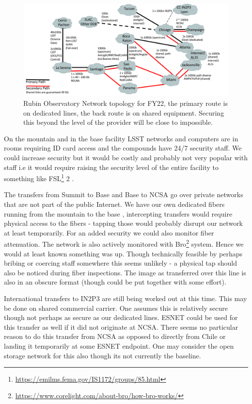 \begin{figure}
\begin{center}
\includegraphics[width=1.0\textwidth]{NetworksFY22}
\caption{Rubin Observatory Network topology for FY22, the primary route is on dedicated lines, the back route is on shared equipment. Securing this beyond the level of the provider will be close to impossible.  \label{fig:net}}
\end{center}
\end{figure}

On the mountain and in the base facility LSST networks and computers are in rooms requiring ID card access and the compounds
have 24/7 security staff.
We could increase security but it would be costly and probably not very popular with staff i.e it would require raising the security level of the entire facility to something like FSL\footnote{\url{https://emilms.fema.gov/IS1172/groups/85.html}} 2 .

The transfers from Summit to Base and Base to NCSA go over private networks that are not part of the public Internet. We have our own dedicated fibers running from the mountain to the base ,
intercepting transfers would require physical access to the fibers - tapping those would probably disrupt our network at least temporarily.
For an added security we could also monitor fiber attenuation.
The network is also actively monitored with Bro\footnote{\url{https://www.corelight.com/about-bro/how-bro-works/}} system. Hence we would at least known something was up.
Though technically feasible by perhaps bribing or coercing staff somewhere this seems unlikely - a physical tap should also be noticed during fiber inspections.  The image as transferred over this line is also in an obscure format (though could be put together with some effort).


International transfers to IN2P3 are still being worked out at this time. This may be done on shared commercial carrier. One assumes
this is relatively secure though not perhaps as secure as our dedicated lines. ESNET could be used for this transfer as well if it did not originate at NCSA. There seems no particular reason to do this transfer from NCSA as opposed to directly from Chile or landing it
temporarily at some ESNET endpoint. One may consider the open storage network \citep{osn} for this also though its not currently the baseline.


